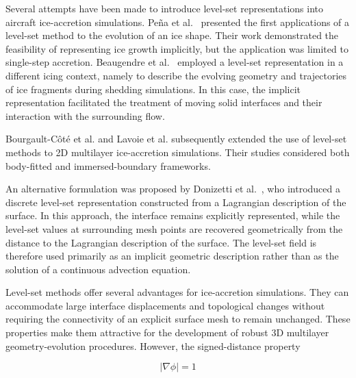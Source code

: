 Several attempts have been made to introduce level-set representations into aircraft ice-accretion simulations. Peña et al.~\cite{PENA2016278} presented the first applications of a level-set method to the evolution of an ice shape. Their work demonstrated the feasibility of representing ice growth implicitly, but the application was limited to single-step accretion.
Beaugendre et al.~\cite{HeloiseBeaugendre} employed a level-set representation in a different icing context, namely to describe the evolving geometry and trajectories of ice fragments during shedding simulations. In this case, the implicit representation facilitated the treatment of moving solid interfaces and their interaction with the surrounding flow.

Bourgault-Côté et al.\cite{bourgault-coteMultilayerAirfoilIce2019} and Lavoie et al.\cite{lavoieLevelSet} subsequently extended the use of level-set methods to 2D multilayer ice-accretion simulations. Their studies considered both body-fitted and immersed-boundary frameworks.

An alternative formulation was proposed by Donizetti et al.~\cite{alessandroLevelSet}, who introduced a discrete level-set representation constructed from a Lagrangian description of the surface. In this approach, the interface remains explicitly represented, while the level-set values at surrounding mesh points are recovered geometrically from the distance to the Lagrangian description of the surface. The level-set field is therefore used primarily as an implicit geometric description rather than as the solution of a continuous advection equation.

Level-set methods offer several advantages for ice-accretion simulations. They can accommodate large interface displacements and topological changes without requiring the connectivity of an explicit surface mesh to remain unchanged. These properties make them attractive for the development of robust 3D multilayer geometry-evolution procedures. However, the signed-distance property

\begin{equation}
\lvert\nabla\phi\rvert=1
\end{equation}

